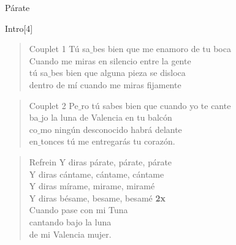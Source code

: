 \begin{song}{Párate}

\begin{instrumental}{Intro}[4]
 \measure{}  
  
\end{instrumental}

\begin{verse}{Couplet 1}
 \hspace{1em} Tú sa$\_$bes bien que me enamoro de tu boca\\
 \hspace{1.3em}Cuando me miras en silencio entre la gente\\
 \hspace{1em} tú sa$\_$bes bien que alguna pieza se disloca\\
 \hspace{1em} dentro de mí cuando me miras fijamente
\end{verse}

\begin{verse}{Couplet 2}
 \hspace{1em} Pe$\_$ro tú sabes bien que cuando yo te cante\\
 \hspace{1em} ba$\_$jo la luna de Valencia en tu balcón\\
 \hspace{1em} co$\_$mo ningún desconocido habrá delante\\
 \hspace{1em} en$\_$tonces tú me entregarás tu corazón.
\end{verse}

\begin{verse}{Refrein}
 \hspace{1em} Y diras párate, párate, párate\\
 \hspace{1em} Y diras cántame, cántame, cántame\\
 \hspace{1em} Y diras mírame, mirame, miramé\\
 \hspace{1em} Y diras bésame, besame, besamé \hspace{1em} \textbf{2x}\\
Cuando pase con mi Tuna\\
cantando bajo \chord{(*)} la luna\\
de mi Valencia mujer.
\end{verse}


\end{song}
